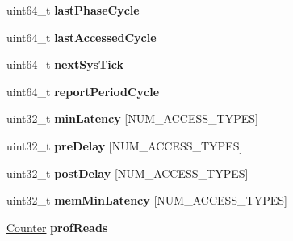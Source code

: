 \begin{DoxyCompactItemize}
\item 
\hypertarget{classMemControllerBase_a6e424049a13aa802ac437ee3fb698420}{uint64\-\_\-t {\bfseries last\-Phase\-Cycle}}\label{classMemControllerBase_a6e424049a13aa802ac437ee3fb698420}

\item 
\hypertarget{classMemControllerBase_a16f3ca2a55ff3354e492c13cde62cace}{uint64\-\_\-t {\bfseries last\-Accessed\-Cycle}}\label{classMemControllerBase_a16f3ca2a55ff3354e492c13cde62cace}

\item 
\hypertarget{classMemControllerBase_ae27a15b7a838401a8ec61a6bb38834d6}{uint64\-\_\-t {\bfseries next\-Sys\-Tick}}\label{classMemControllerBase_ae27a15b7a838401a8ec61a6bb38834d6}

\item 
\hypertarget{classMemControllerBase_aed5a352c4f08eba314634c2c8a5fd6f9}{uint64\-\_\-t {\bfseries report\-Period\-Cycle}}\label{classMemControllerBase_aed5a352c4f08eba314634c2c8a5fd6f9}

\item 
\hypertarget{classMemControllerBase_a82c1b0a5d6b3cb446838248175000070}{uint32\-\_\-t {\bfseries min\-Latency} \mbox{[}N\-U\-M\-\_\-\-A\-C\-C\-E\-S\-S\-\_\-\-T\-Y\-P\-E\-S\mbox{]}}\label{classMemControllerBase_a82c1b0a5d6b3cb446838248175000070}

\item 
\hypertarget{classMemControllerBase_ab9b72a314b695e8d6085c471b68c8371}{uint32\-\_\-t {\bfseries pre\-Delay} \mbox{[}N\-U\-M\-\_\-\-A\-C\-C\-E\-S\-S\-\_\-\-T\-Y\-P\-E\-S\mbox{]}}\label{classMemControllerBase_ab9b72a314b695e8d6085c471b68c8371}

\item 
\hypertarget{classMemControllerBase_a460098298842fbd7b8c9141b92877539}{uint32\-\_\-t {\bfseries post\-Delay} \mbox{[}N\-U\-M\-\_\-\-A\-C\-C\-E\-S\-S\-\_\-\-T\-Y\-P\-E\-S\mbox{]}}\label{classMemControllerBase_a460098298842fbd7b8c9141b92877539}

\item 
\hypertarget{classMemControllerBase_a4aeccac10bbccdae9d01434907e7a6ef}{uint32\-\_\-t {\bfseries mem\-Min\-Latency} \mbox{[}N\-U\-M\-\_\-\-A\-C\-C\-E\-S\-S\-\_\-\-T\-Y\-P\-E\-S\mbox{]}}\label{classMemControllerBase_a4aeccac10bbccdae9d01434907e7a6ef}

\item 
\hypertarget{classMemControllerBase_ae929fe2f7d8d019a62e5f2f5b80d3cf7}{\hyperlink{classCounter}{Counter} {\bfseries prof\-Reads}}\label{classMemControllerBase_ae929fe2f7d8d019a62e5f2f5b80d3cf7}


\end{DoxyCompactItemize}
